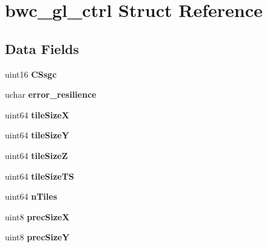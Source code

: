 \hypertarget{structbwc__gl__ctrl}{}\section{bwc\+\_\+gl\+\_\+ctrl Struct Reference}
\label{structbwc__gl__ctrl}
\subsection*{Data Fields}
\begin{DoxyCompactItemize}
\item 
\mbox{\label{structbwc__gl__ctrl_a4d97d08a50bb313199945144b1a67244}} 
uint16 {\bfseries C\+Ssgc}
\item 
\mbox{\label{structbwc__gl__ctrl_a816fe0535fd1f79d010d65026e0ab0cb}} 
uchar {\bfseries error\+\_\+resilience}
\item 
\mbox{\label{structbwc__gl__ctrl_aec087b3f53faa7ffbe7ad8cd15ce7240}} 
uint64 {\bfseries tile\+SizeX}
\item 
\mbox{\label{structbwc__gl__ctrl_a403be5c5a8a699148b0b771302f9ad25}} 
uint64 {\bfseries tile\+SizeY}
\item 
\mbox{\label{structbwc__gl__ctrl_ae85438a771b35d14e982c495c9948c1c}} 
uint64 {\bfseries tile\+SizeZ}
\item 
\mbox{\label{structbwc__gl__ctrl_aaaa7310f1f4743cd72ba4356d76a3964}} 
uint64 {\bfseries tile\+Size\+TS}
\item 
\mbox{\label{structbwc__gl__ctrl_a0ac5467e88cf804cf9cfc50e68976980}} 
uint64 {\bfseries n\+Tiles}
\item 
\mbox{\label{structbwc__gl__ctrl_a965df5335b0e96cc396e42e3b0c32507}} 
uint8 {\bfseries prec\+SizeX}
\item 
\mbox{\label{structbwc__gl__ctrl_ae1bfaaf94ff5f3b946acef99a63085dc}} 
uint8 {\bfseries prec\+SizeY}
\item 
\mbox{\label{structbwc__gl__ctrl_aa151fbb28cf57d49dab6a7aea94bad5b}} 

\end{DoxyCompactItemize}
